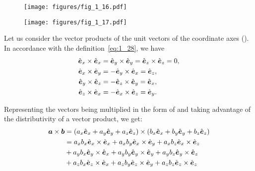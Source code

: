 \begin{figure}[t]
	\begin{minipage}[t]{0.5\linewidth}
		\begin{center}
			\texttt{[image: figures/fig\_1\_16.pdf]}
			\caption[]{}
			\label{fig:1_16}
		\end{center}
	\end{minipage}
	\hfill{ }%
	\begin{minipage}[t]{0.5\linewidth}
		\begin{center}
			\texttt{[image: figures/fig\_1\_17.pdf]}
			\caption[]{}
			\label{fig:1_17}
		\end{center}
	\end{minipage}
	\vspace{-0.3cm}
\end{figure}

Let us consider the vector products of the unit vectors of the coordinate axes (). In accordance with the definition~\eqref{eq:1_28}, we have
\begin{align}
\vecuniprod{x}{x} &= \vecuniprod{y}{y} = \vecuniprod{z}{z} = 0,\nonumber\\
\vecuniprod{x}{y} &= -\vecuniprod{y}{x} = \vecuni{z},\label{eq:1_31}\\
\vecuniprod{y}{z} &= -\vecuniprod{z}{y} = \vecuni{x},\nonumber\\
\vecuniprod{z}{x} &= -\vecuniprod{x}{z} = \vecuni{y}.\nonumber
\end{align}

\noindent
Representing the vectors being multiplied in the form of  and taking advantage of the distributivity of a vector product, we get:
\begin{align*}
\vecprod{a}{b} &= (a_x\vecuni{x}+a_y\vecuni{y}+a_z\vecuni{z})\times(b_x\vecuni{x}+b_y\vecuni{y}+b_z\vecuni{z})\\
&= a_xb_x\vecuniprod{x}{x} + a_xb_y\vecuniprod{x}{y} + a_xb_z\vecuniprod{x}{z}\\
&+ a_yb_x\vecuniprod{y}{x} + a_yb_y\vecuniprod{y}{y} + a_yb_z\vecuniprod{y}{z}\\
&+ a_zb_x\vecuniprod{z}{x} + a_zb_y\vecuniprod{z}{y} + a_zb_z\vecuniprod{z}{z}
\end{align*}


